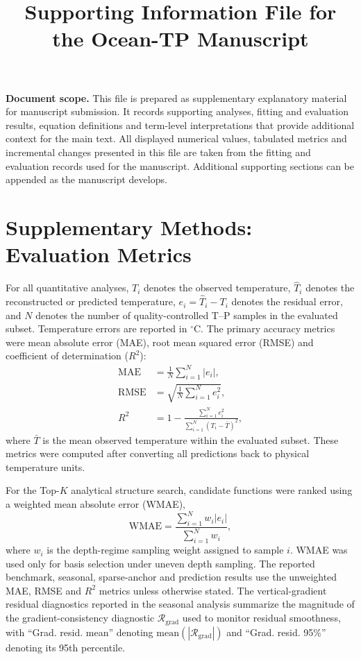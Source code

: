 \documentclass[10pt]{article}
\title{Supporting Information File for the Ocean-TP Manuscript}
\author{}
\date{}
\begin{document}
\maketitle

\noindent\textcolor{noteRed}{\textbf{Document scope.}}
This file is prepared as supplementary explanatory material for manuscript submission.
It records supporting analyses, fitting and evaluation results, equation definitions and term-level interpretations that provide additional context for the main text.
All displayed numerical values, tabulated metrics and incremental changes presented in this file are taken from the fitting and evaluation records used for the manuscript.
Additional supporting sections can be appended as the manuscript develops.

\vspace{0.8em}

\section{Supplementary Methods: Evaluation Metrics}
\label{sec:supp-evaluation-metrics}

For all quantitative analyses, $T_i$ denotes the observed temperature, $\hat{T}_i$ denotes the reconstructed or predicted temperature, $e_i=\hat{T}_i-T_i$ denotes the residual error, and $N$ denotes the number of quality-controlled T--P samples in the evaluated subset.
Temperature errors are reported in $^\circ$C.
The primary accuracy metrics were mean absolute error (MAE), root mean squared error (RMSE) and coefficient of determination ($R^2$):
\begin{align}
\mathrm{MAE} &= \frac{1}{N}\sum_{i=1}^{N}|e_i|,\\
\mathrm{RMSE} &= \sqrt{\frac{1}{N}\sum_{i=1}^{N}e_i^2},\\
R^2 &= 1-\frac{\sum_{i=1}^{N}e_i^2}{\sum_{i=1}^{N}(T_i-\bar{T})^2},
\end{align}
where $\bar{T}$ is the mean observed temperature within the evaluated subset.
These metrics were computed after converting all predictions back to physical temperature units.

For the Top-$K$ analytical structure search, candidate functions were ranked using a weighted mean absolute error (WMAE),
\begin{equation}
\mathrm{WMAE}=\frac{\sum_{i=1}^{N}w_i|e_i|}{\sum_{i=1}^{N}w_i},
\end{equation}
where $w_i$ is the depth-regime sampling weight assigned to sample $i$.
WMAE was used only for basis selection under uneven depth sampling.
The reported benchmark, seasonal, sparse-anchor and prediction results use the unweighted MAE, RMSE and $R^2$ metrics unless otherwise stated.
The vertical-gradient residual diagnostics reported in the seasonal analysis summarize the magnitude of the gradient-consistency diagnostic $\mathcal{R}_{\mathrm{grad}}$ used to monitor residual smoothness, with ``Grad. resid. mean'' denoting $\mathrm{mean}(|\mathcal{R}_{\mathrm{grad}}|)$ and ``Grad. resid. 95\%'' denoting its 95th percentile.
\end{document}
